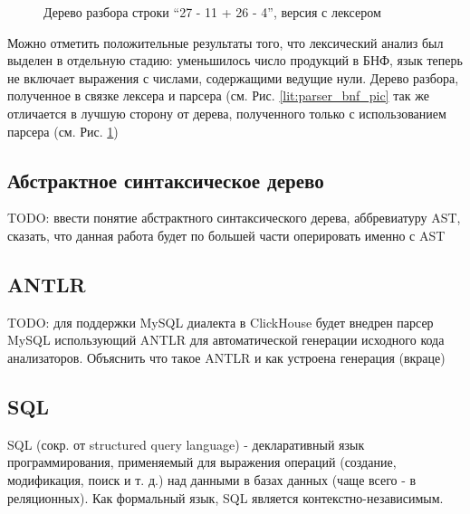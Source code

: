 \begin{figure}[ht]
\begin{center}
\caption{
\label{lit:bnf_ex_pic} Дерево разбора строки \enquote{27 - 11 + 26 - 4}, версия с лексером
}
\end{center}
\end{figure}

Можно отметить положительные результаты того, что лексический анализ был выделен в отдельную стадию: уменьшилось число продукций в БНФ, язык теперь не включает выражения с числами, содержащими ведущие нули. Дерево разбора, полученное в связке лексера и парсера (см. Рис. \ref{lit:parser_bnf_pic} так же отличается в лучшую сторону от дерева, полученного только с использованием парсера (см. Рис. \ref{lit:bnf_ex_pic})

\subsection{Абстрактное синтаксическое дерево}
TODO: ввести понятие абстрактного синтаксического дерева, аббревиатуру AST, сказать, что данная работа будет по большей части оперировать именно с AST

\subsection{ANTLR}
TODO: для поддержки MySQL диалекта в ClickHouse будет внедрен парсер MySQL использующий ANTLR для автоматической генерации исходного кода анализаторов. Объяснить что такое ANTLR и как устроена генерация (вкраце)


\subsection{SQL} \label{lit:sql}
SQL (сокр. от structured query language) - декларативный язык программирования, применяемый для выражения операций (создание, модификация, поиск и т. д.) над данными в базах данных (чаще всего - в реляционных). Как формальный язык, SQL является контекстно-независимым.

